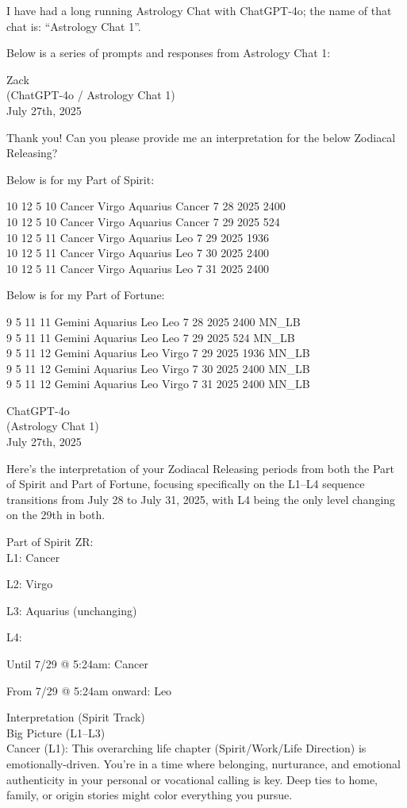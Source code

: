 \documentclass{article}
\begin{document}
I have had a long running Astrology Chat with ChatGPT-4o; the name of
that chat is: ``Astrology Chat 1''.

Below is a series of prompts and responses from Astrology Chat 1:

Zack\\
(ChatGPT-4o / Astrology Chat 1)\\
July 27th, 2025

Thank you! Can you please provide me an interpretation for the below
Zodiacal Releasing?

Below is for my Part of Spirit:

10 12 5 10 Cancer Virgo Aquarius Cancer 7 28 2025 2400\\
10 12 5 10 Cancer Virgo Aquarius Cancer 7 29 2025 524\\
10 12 5 11 Cancer Virgo Aquarius Leo 7 29 2025 1936\\
10 12 5 11 Cancer Virgo Aquarius Leo 7 30 2025 2400\\
10 12 5 11 Cancer Virgo Aquarius Leo 7 31 2025 2400

Below is for my Part of Fortune:

9 5 11 11 Gemini Aquarius Leo Leo 7 28 2025 2400 MN\_LB\\
9 5 11 11 Gemini Aquarius Leo Leo 7 29 2025 524 MN\_LB\\
9 5 11 12 Gemini Aquarius Leo Virgo 7 29 2025 1936 MN\_LB\\
9 5 11 12 Gemini Aquarius Leo Virgo 7 30 2025 2400 MN\_LB\\
9 5 11 12 Gemini Aquarius Leo Virgo 7 31 2025 2400 MN\_LB

ChatGPT-4o\\
(Astrology Chat 1)\\
July 27th, 2025

Here's the interpretation of your Zodiacal Releasing periods from both
the Part of Spirit and Part of Fortune, focusing specifically on the
L1--L4 sequence transitions from July 28 to July 31, 2025, with L4 being
the only level changing on the 29th in both.

 Part of Spirit ZR:\\
L1: Cancer

L2: Virgo

L3: Aquarius (unchanging)

L4:

Until 7/29 @ 5:24am: Cancer

From 7/29 @ 5:24am onward: Leo

 Interpretation (Spirit Track)\\
Big Picture (L1--L3)\\
Cancer (L1): This overarching life chapter (Spirit/Work/Life Direction)
is emotionally-driven. You're in a time where belonging, nurturance, and
emotional authenticity in your personal or vocational calling is key.
Deep ties to home, family, or origin stories might color everything you
pursue.
\end{document}

